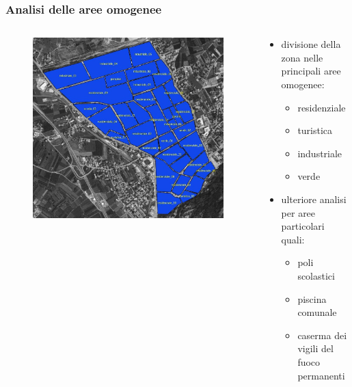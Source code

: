 \documentclass{beamer}
\begin{document}
\begin{frame}
 \frametitle{Analisi delle aree omogenee}
 
 \begin{columns}
  \begin{column}{.5\textwidth}
   \begin{figure}
    \centering
    \includegraphics[width=\linewidth]{images/analisi_area}
   \end{figure}
  \end{column}
  
  \begin{column}{.5\textwidth}
   \begin{itemize}[]
    \item divisione della zona nelle principali aree omogenee:
    \begin{itemize}[]
     \item residenziale
     \item turistica
     \item industriale
     \item verde
    \end{itemize}
    \item ulteriore analisi per aree particolari quali:
    \begin{itemize}
     \item poli scolastici
     \item piscina comunale
     \item caserma dei vigili del fuoco permanenti
    \end{itemize}
   \end{itemize}
  \end{column}
 \end{columns} 
\end{frame}
\end{document}
